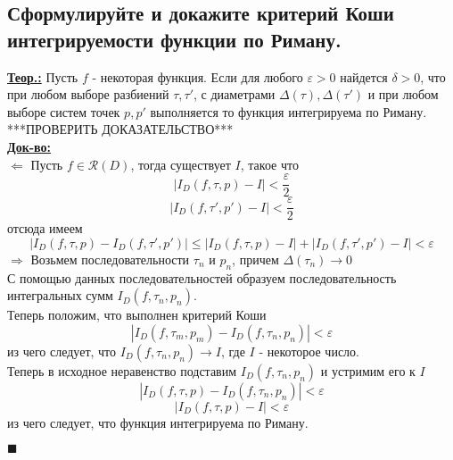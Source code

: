 
\subsection{Сформулируйте и докажите критерий Коши интегрируемости функции по Риману.}

\textbf{\underline{Теор.:} } Пусть $f$ - некоторая функция. Если для любого $\varepsilon > 0$ найдется $\delta > 0$, что при любом выборе разбиений $\tau, \tau'$, с диаметрами $\Delta(\tau), \Delta(\tau')$ и при любом выборе систем точек $p, p'$ выполняется 
то функция интегрируема по Риману.\\
***ПРОВЕРИТЬ ДОКАЗАТЕЛЬСТВО*** \\
\textbf{\underline{Док-во:} } \\
$\Leftarrow$ Пусть $f \in \mathcal{R}(D)$, тогда существует $I$, такое что 
\[|I_D(f, \tau, p) - I| < \frac{\varepsilon}{2}\]
\[|I_D(f, \tau', p') - I| < \frac{\varepsilon}{2}\]
отсюда имеем
\[|I_D(f, \tau, p) - I_D(f, \tau', p')| \leq |I_D(f, \tau, p) - I| + |I_D(f, \tau', p') - I| < \varepsilon\]
$\Rightarrow$ Возьмем последовательности $\tau_n$ и $p_n$, причем $\Delta(\tau_n) \rightarrow 0$ \\
С помощью данных последовательностей образуем последовательность интегральных сумм $I_D(f, \tau_n, p_n)$. \\
Теперь положим, что выполнен критерий Коши
\[|I_D(f, \tau_m, p_m) - I_D(f, \tau_n, p_n)| < \varepsilon\]
из чего следует, что $I_D(f, \tau_n, p_n) \rightarrow I$, где $I$ - некоторое число. \\
Теперь в исходное неравенство подставим $I_D(f, \tau_n, p_n)$ и устримим его к $I$
\[|I_D(f, \tau, p) - I_D(f, \tau_n, p_n)| < \varepsilon\]
\[|I_D(f, \tau, p) - I| < \varepsilon\] 
из чего следует, что функция интегрируема по Риману.
\begin{flushright}
$\blacksquare$
\end{flushright}


